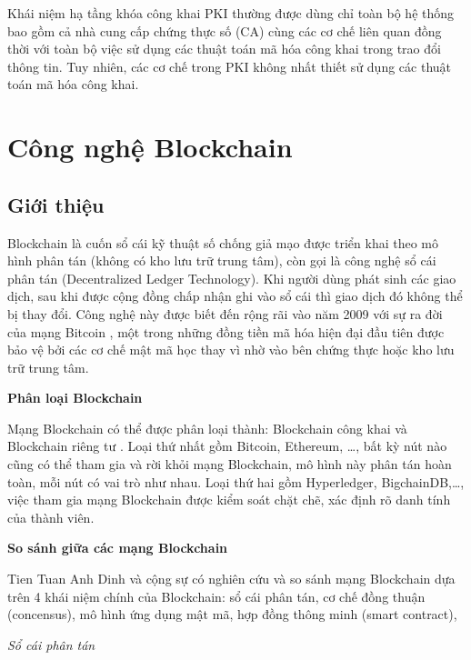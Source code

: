 Khái niệm hạ tầng khóa công khai PKI thường được dùng chỉ toàn bộ hệ thống bao gồm cả nhà cung cấp chứng thực số (CA) cùng các cơ chế liên quan đồng thời với toàn bộ việc sử dụng các thuật toán mã hóa công khai trong trao đổi thông tin. Tuy nhiên, các cơ chế trong PKI không nhất thiết sử dụng các thuật toán mã hóa công khai.

\section{Công nghệ Blockchain}
\subsection{Giới thiệu}
Blockchain là cuốn sổ cái kỹ thuật số chống giả mạo được triển khai theo mô hình phân tán (không có kho lưu trữ trung tâm), còn gọi là công nghệ sổ cái phân tán (Decentralized Ledger Technology).
Khi người dùng phát sinh các giao dịch, sau khi được cộng đồng chấp nhận ghi vào sổ cái thì giao dịch đó không thể bị thay đổi.
Công nghệ này được biết đến rộng rãi vào năm 2009 với sự ra đời của mạng Bitcoin \cite{nakamoto2008bitcoin}, một trong những đồng tiền mã hóa hiện đại đầu tiên được bảo vệ bởi các cơ chế mật mã học thay vì nhờ vào bên chứng thực hoặc kho lưu trữ trung tâm.

\textbf{Phân loại Blockchain}

Mạng Blockchain có thể được phân loại thành: Blockchain công khai và Blockchain riêng tư \cite{8246573}. 
Loại thứ nhất gồm Bitcoin, Ethereum, \ldots, bất kỳ nút nào cũng có thể tham gia và rời khỏi mạng Blockchain, mô hình này phân tán hoàn toàn, mỗi nút có vai trò như nhau.
Loại thứ hai gồm Hyperledger, BigchainDB,\ldots, việc tham gia mạng Blockchain được kiểm soát chặt chẽ, xác định rõ danh tính của thành viên.

\textbf{So sánh giữa các mạng Blockchain}

Tien Tuan Anh Dinh và cộng sự  \cite{8246573} có nghiên cứu và so sánh mạng Blockchain dựa trên 4 khái niệm chính của Blockchain: sổ cái phân tán, cơ chế đồng thuận (concensus), mô hình ứng dụng mật mã, hợp đồng thông minh (smart contract),

\emph{Sổ cái phân tán}

